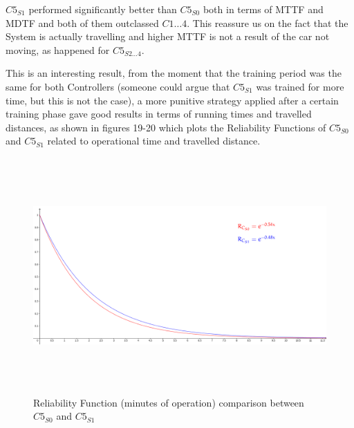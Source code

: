 $C5_{S1}$ performed significantly better than $C5_{S0}$ both in terms of MTTF and MDTF and both of them outclassed $C1\dots 4$. This reassure us on the fact that the System is actually travelling and higher MTTF is not a result of the car not moving, as happened for $C5_{S2\dots 4}$.

This is an interesting result, from the moment that the training period was the same for both Controllers (someone could argue that $C5_{S1}$ was trained for more time, but this is not the case), a more punitive strategy applied after a certain training phase gave good results in terms of running times and travelled distances, as shown in figures 19-20 which plots the Reliability Functions of $C5_{S0}$ and $C5_{S1}$ related to operational time and travelled distance.

\vspace{0.5cm}

\begin{figure}[h!]
	\includegraphics[width=\textwidth, height=9cm]{img/reliability-pro-stupid-comparison.png}
	\caption{Reliability Function (minutes of operation) comparison between $C5_{S0}$ and $C5_{S1}$}
\end{figure}

